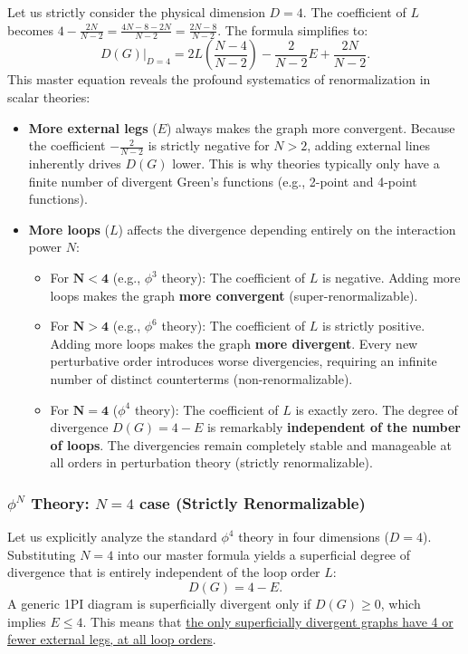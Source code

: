 Let us strictly consider the physical dimension $D = 4$. The coefficient of $L$ becomes $4 - \frac{2N}{N-2} = \frac{4N - 8 - 2N}{N-2} = \frac{2N - 8}{N-2}$. The formula simplifies to:
\[
    D(G)\Big|_{D=4} = 2L \left( \frac{N-4}{N-2} \right) - \frac{2}{N-2} E + \frac{2N}{N-2}.
\]
This master equation reveals the profound systematics of renormalization in scalar theories:
\begin{itemize}
    \item \textbf{More external legs} ($E$) always makes the graph more convergent. Because the coefficient $-\frac{2}{N-2}$ is strictly negative for $N>2$, adding external lines inherently drives $D(G)$ lower. This is why theories typically only have a finite number of divergent Green's functions (e.g., 2-point and 4-point functions).
    \item \textbf{More loops} ($L$) affects the divergence depending entirely on the interaction power $N$:
          \begin{itemize}
              \item For $\mathbf{N < 4}$ (e.g., $\phi^3$ theory): The coefficient of $L$ is negative. Adding more loops makes the graph \textbf{more convergent} (super-renormalizable).
              \item For $\mathbf{N > 4}$ (e.g., $\phi^6$ theory): The coefficient of $L$ is strictly positive. Adding more loops makes the graph \textbf{more divergent}. Every new perturbative order introduces worse divergencies, requiring an infinite number of distinct counterterms (non-renormalizable).
              \item For $\mathbf{N = 4}$ ($\phi^4$ theory): The coefficient of $L$ is exactly zero. The degree of divergence $D(G) = 4 - E$ is remarkably \textbf{independent of the number of loops}. The divergencies remain completely stable and manageable at all orders in perturbation theory (strictly renormalizable).
          \end{itemize}
\end{itemize}

\subsubsection{\(\phi^N\) Theory: \(N=4\) case (Strictly Renormalizable)}

Let us explicitly analyze the standard \(\phi^4\) theory in four dimensions (\(D=4\)). Substituting \(N=4\) into our master formula yields a superficial degree of divergence that is entirely independent of the loop order \(L\):
\[
    D(G) = 4 - E.
\]
A generic 1PI diagram is superficially divergent only if \(D(G) \geq 0\), which implies \(E \leq 4\). This means that \uline{the only superficially divergent graphs have 4 or fewer external legs, at all loop orders}.

